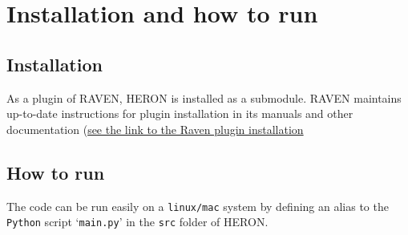 \section{ Installation and how to run}
\subsection{Installation}
As a plugin of RAVEN, HERON is installed as a submodule. RAVEN maintains up-to-date instructions for plugin installation in its manuals and other documentation (\href{https://github.com/idaholab/raven/wiki/Plugins}{see the link to the Raven plugin installation} 
\subsection{How to run}
The code can be run easily on a \texttt{linux/mac} system by defining an alias to the \texttt{Python} script `\texttt{main.py}' in the \texttt{src} folder of  HERON.
